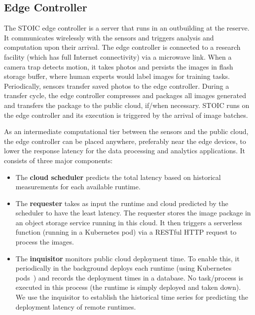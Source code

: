 \subsection{Edge Controller} 

The STOIC edge controller is a server that runs in an
outbuilding at the reserve. It communicates wirelessly with the sensors and triggers analysis and computation upon their arrival. The edge controller is connected to a research facility (which has full Internet connectivity) 
via a microwave link. When a camera trap detects motion, it takes photos and persists the images in flash storage buffer, where human experts would label images for training tasks. Periodically, sensors transfer saved photos to the edge controller. During a transfer cycle, the edge controller compresses and packages all images generated and transfers the package to the public cloud, if/when necessary. STOIC runs on the edge controller and its execution is triggered by the arrival of image batches. 

As an intermediate computational tier between the sensors and the public cloud, the edge controller can be placed anywhere, preferably near the edge devices, to lower the response latency for the data processing and analytics applications. It consists of three major components: 
\begin{itemize}
\item The \textbf{cloud scheduler} predicts the total latency based on historical measurements for each available runtime. 
\item The \textbf{requester} takes as input the runtime and cloud predicted by the scheduler to have the least latency.  The requester stores the image package in an object storage service running in this cloud. It then triggers a serverless function (running in a Kubernetes pod) via a RESTful HTTP request to process the images.
\item The \textbf{inquisitor} monitors public cloud deployment time. To enable this, it periodically in the background deploys each runtime (using Kubernetes pods~\cite{ref:pods}) and records the deployment times in a database. No task/process is executed in this process (the runtime is simply deployed and taken down). We use the inquisitor to establish the historical time series for predicting the deployment latency of remote runtimes.
\end{itemize}

